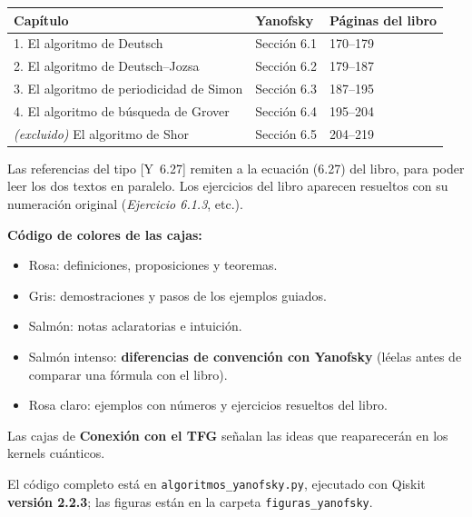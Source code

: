 \documentclass[11pt, a4paper, twoside, openright]{report}
\newcommand{\Yan}[1]{\textcolor{rosaviejo}{\small[Y~#1]}}  %
\begin{document}
\begin{center}
\small\renewcommand{\arraystretch}{1.2}
\begin{tabular}{l|l|l}
\textbf{Capítulo} & \textbf{Yanofsky} & \textbf{Páginas del libro} \\ \hline
1. El algoritmo de Deutsch & Sección 6.1 & 170--179 \\
2. El algoritmo de Deutsch--Jozsa & Sección 6.2 & 179--187 \\
3. El algoritmo de periodicidad de Simon & Sección 6.3 & 187--195 \\
4. El algoritmo de búsqueda de Grover & Sección 6.4 & 195--204 \\
\textit{(excluido)} El algoritmo de Shor & Sección 6.5 & 204--219
\end{tabular}
\end{center}

\noindent Las referencias del tipo \Yan{6.27} remiten a la ecuación (6.27) del libro, para poder leer los dos textos en paralelo. Los ejercicios del libro aparecen resueltos con su numeración original (\textit{Ejercicio 6.1.3}, etc.).

\noindent \textbf{Código de colores de las cajas:}
\begin{itemize}
    \item \colorbox{rosa!5}{Rosa}: definiciones, proposiciones y teoremas.
    \item \colorbox{gray!8}{Gris}: demostraciones y pasos de los ejemplos guiados.
    \item \colorbox{salmon!10}{Salmón}: notas aclaratorias e intuición.
    \item \colorbox{salmon!18}{Salmón intenso}: \textbf{diferencias de convención con Yanofsky} (léelas antes de comparar una fórmula con el libro).
    \item \colorbox{rosaclaro!25}{Rosa claro}: ejemplos con números y ejercicios resueltos del libro.
\end{itemize}
Las cajas de \textbf{Conexión con el TFG} señalan las ideas que reaparecerán en los kernels cuánticos.

\noindent El código completo está en \texttt{algoritmos\_yanofsky.py}, ejecutado con Qiskit \textbf{versión 2.2.3}; las figuras están en la carpeta \texttt{figuras\_yanofsky}.

\cleardoublepage
\tableofcontents

\cleardoublepage
\end{document}
